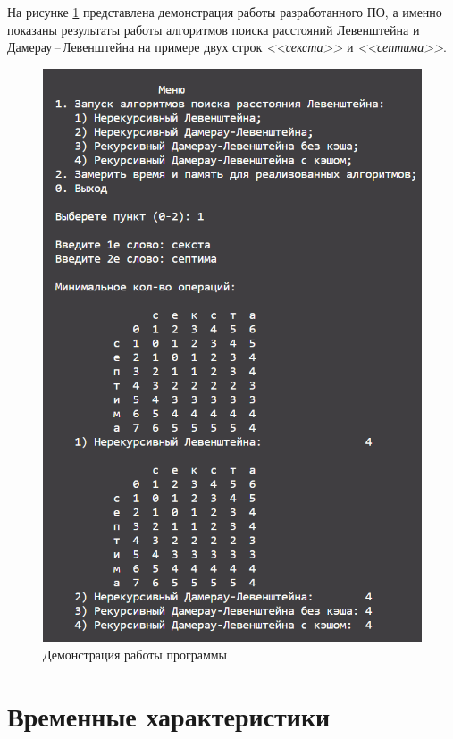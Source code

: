 На рисунке \ref{img:demonstration} представлена демонстрация работы разработанного ПО, а именно показаны результаты работы алгоритмов поиска расстояний Левенштейна и Дамерау\,--\,Левенштейна на примере двух строк \textit{<<секста>>} и \textit{<<септима>>}.  
\clearpage
\begin{figure}[h]
	\centering
	\includegraphics[height=0.7\textheight]{img/prog_work.png}
	\caption{Демонстрация работы программы}
	\label{img:demonstration}
\end{figure}

\clearpage

\section{Временные характеристики}

